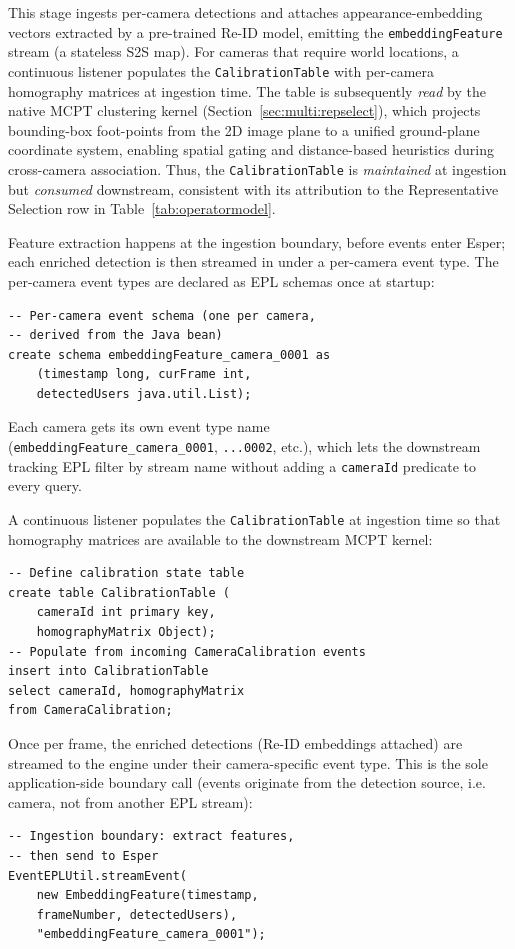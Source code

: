 \documentclass[5p,times]{elsarticle}
\begin{document}
This stage ingests per-camera detections and attaches appearance-embedding vectors extracted by a pre-trained Re-ID model, emitting the \texttt{embeddingFeature} stream (a stateless S2S map). For cameras that require world locations, a continuous listener populates the \texttt{CalibrationTable} with per-camera homography matrices at ingestion time. The table is subsequently \emph{read} by the native MCPT clustering kernel (Section~\ref{sec:multi:repselect}), which projects bounding-box foot-points from the 2D image plane to a unified ground-plane coordinate system, enabling spatial gating and distance-based heuristics during cross-camera association. Thus, the \texttt{CalibrationTable} is \emph{maintained} at ingestion but \emph{consumed} downstream, consistent with its attribution to the Representative Selection row in Table~\ref{tab:operatormodel}.


Feature extraction happens at the ingestion boundary, before events enter Esper; each enriched detection is then streamed in under a per-camera event type. The per-camera event types are declared as EPL schemas once at startup:
{\small
\begin{verbatim}
-- Per-camera event schema (one per camera, 
-- derived from the Java bean)
create schema embeddingFeature_camera_0001 as
    (timestamp long, curFrame int, 
    detectedUsers java.util.List);
\end{verbatim}
}
Each camera gets its own event type name \\(\texttt{embeddingFeature\_camera\_0001}, \texttt{...0002}, etc.), which lets the downstream tracking EPL filter by stream name without adding a \texttt{cameraId} predicate to every query.

A continuous listener populates the \texttt{CalibrationTable} at ingestion time so that homography matrices are available to the downstream MCPT kernel:
{\small
\begin{verbatim}
-- Define calibration state table
create table CalibrationTable (
    cameraId int primary key,
    homographyMatrix Object);
-- Populate from incoming CameraCalibration events
insert into CalibrationTable
select cameraId, homographyMatrix 
from CameraCalibration;
\end{verbatim}
}
Once per frame, the enriched detections (Re-ID embeddings attached) are streamed to the engine under their camera-specific event type. This is the sole application-side boundary call (events originate from the detection source, i.e. camera, not from another EPL stream):
{\small
\begin{verbatim}
-- Ingestion boundary: extract features,
-- then send to Esper
EventEPLUtil.streamEvent(
    new EmbeddingFeature(timestamp, 
    frameNumber, detectedUsers),
    "embeddingFeature_camera_0001");
\end{verbatim}
}
\end{document}
